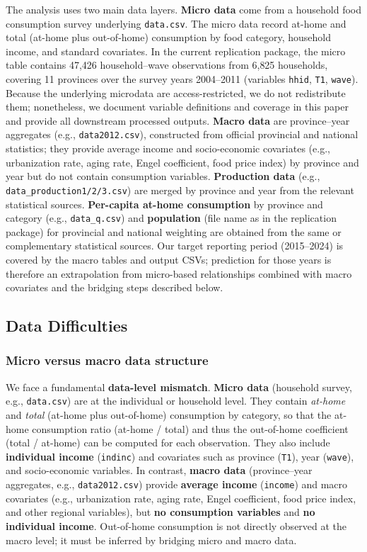 The analysis uses two main data layers. \textbf{Micro data} come from a household food consumption survey underlying \texttt{data.csv}. The micro data record at-home and total (at-home plus out-of-home) consumption by food category, household income, and standard covariates. In the current replication package, the micro table contains 47{,}426 household--wave observations from 6{,}825 households, covering 11 provinces over the survey years 2004--2011 (variables \texttt{hhid}, \texttt{T1}, \texttt{wave}). Because the underlying microdata are access-restricted, we do not redistribute them; nonetheless, we document variable definitions and coverage in this paper and provide all downstream processed outputs. \textbf{Macro data} are province--year aggregates (e.g., \texttt{data2012.csv}), constructed from official provincial and national statistics; they provide average income and socio-economic covariates (e.g., urbanization rate, aging rate, Engel coefficient, food price index) by province and year but do not contain consumption variables. \textbf{Production data} (e.g., \texttt{data\_production1/2/3.csv}) are merged by province and year from the relevant statistical sources. \textbf{Per-capita at-home consumption} by province and category (e.g., \texttt{data\_q.csv}) and \textbf{population} (file name as in the replication package) for provincial and national weighting are obtained from the same or complementary statistical sources. Our target reporting period (2015--2024) is covered by the macro tables and output CSVs; prediction for those years is therefore an extrapolation from micro-based relationships combined with macro covariates and the bridging steps described below.

\subsection{Data Difficulties}
\label{subsec:data-difficulties}

\subsubsection{Micro versus macro data structure}
\label{subsec:micro-macro}

We face a fundamental \textbf{data-level mismatch}. \textbf{Micro data} (household survey, e.g., \texttt{data.csv}) are at the individual or household level. They contain \emph{at-home} and \emph{total} (at-home plus out-of-home) consumption by category, so that the at-home consumption ratio (at-home / total) and thus the out-of-home coefficient (total / at-home) can be computed for each observation. They also include \textbf{individual income} (\texttt{indinc}) and covariates such as province (\texttt{T1}), year (\texttt{wave}), and socio-economic variables. In contrast, \textbf{macro data} (province--year aggregates, e.g., \texttt{data2012.csv}) provide \textbf{average income} (\texttt{income}) and macro covariates (e.g., urbanization rate, aging rate, Engel coefficient, food price index, and other regional variables), but \textbf{no consumption variables} and \textbf{no individual income}. Out-of-home consumption is not directly observed at the macro level; it must be inferred by bridging micro and macro data.

